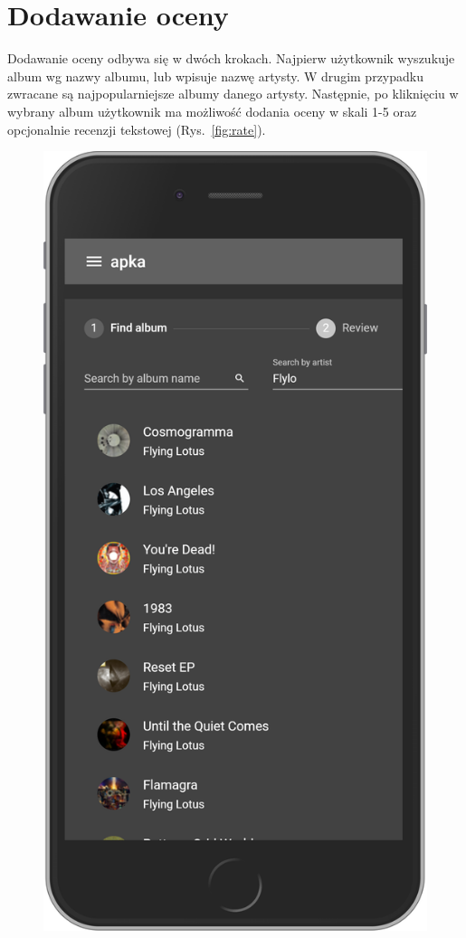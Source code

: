 \section{Dodawanie oceny}
	Dodawanie oceny odbywa się w dwóch krokach.
	Najpierw użytkownik wyszukuje album wg nazwy albumu, lub wpisuje nazwę artysty.
	W drugim przypadku zwracane są najpopularniejsze albumy danego artysty.
	Następnie, po kliknięciu w wybrany album użytkownik ma możliwość dodania oceny w skali 1-5 oraz opcjonalnie recenzji tekstowej (Rys.~\ref{fig:rate}).
	\begin{figure}[H]
		\centering
		\begin{minipage}{.5\textwidth}
			\includegraphics[width=0.9\linewidth]{rys06/search.png}

\end{minipage}
\end{figure}
